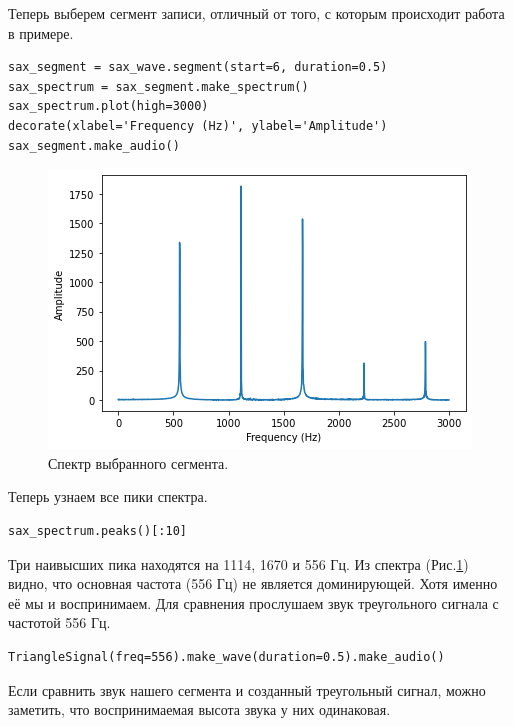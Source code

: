 \documentclass[a4paper, 14pt]{extarticle}
\begin{document}
    Теперь выберем сегмент записи, отличный от того, с которым происходит работа в примере.

    \begin{lstlisting}[caption= Выбор сегмента и получение его спектра., label={lst:task4_spectrum}]
sax_segment = sax_wave.segment(start=6, duration=0.5)
sax_spectrum = sax_segment.make_spectrum()
sax_spectrum.plot(high=3000)
decorate(xlabel='Frequency (Hz)', ylabel='Amplitude')
sax_segment.make_audio()    \end{lstlisting}

    \begin{figure}[H]
        \centering
        \includegraphics[width=0.7\linewidth]{resources/Images/task4_spectrum}
        \caption{Спектр выбранного сегмента.}
        \label{fig:task4_spectrum}
    \end{figure}

    Теперь узнаем все пики спектра.

    \begin{lstlisting}[caption= Получение пиков спектра., label={lst:task4_peaks}]
sax_spectrum.peaks()[:10]   \end{lstlisting}

    Три наивысших пика находятся на 1114, 1670 и 556 Гц. Из спектра (Рис.\ref{fig:task4_spectrum}) видно, что основная
    частота (556 Гц) не является доминирующей. Хотя именно её мы и воспринимаем. Для сравнения прослушаем звук
    треугольного сигнала с частотой 556 Гц.

    \begin{lstlisting}[caption= Треугольный сигнал с частотой 556 Гц., label={lst:task4_triangle1}]
TriangleSignal(freq=556).make_wave(duration=0.5).make_audio()   \end{lstlisting}

    Если сравнить звук нашего сегмента и созданный треугольный сигнал, можно заметить, что воспринимаемая высота звука
    у них одинаковая.
\end{document}
